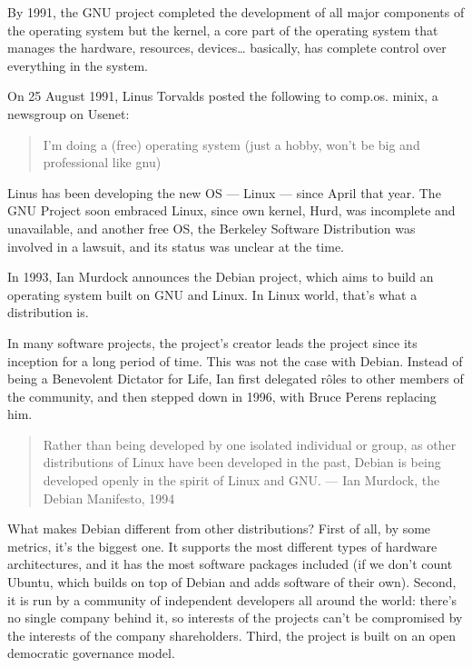\documentclass[10pt, a5paper]{article}
\begin{document}
By 1991, the GNU project completed the development of all major components of the operating system but the kernel, a core part of the operating system that manages the hardware, resources, devices\ldots{} basically, has complete control over everything in the system.

On 25 August 1991, Linus Torvalds posted the following to comp.os. minix, a newsgroup on Usenet:

\begin{quotation}
I'm doing a (free) operating system (just a hobby, won't be big and professional like gnu)

\end{quotation}

Linus has been developing the new OS  —  Linux  —  since April that year. The GNU Project soon embraced Linux, since own kernel, Hurd, was incomplete and unavailable, and another free OS, the Berkeley Software Distribution was involved in a lawsuit, and its status was unclear at the time.

In 1993, Ian Murdock announces the Debian project, which aims to build an operating system built on GNU and Linux. In Linux world, that's what a distribution is.

In many software projects, the project's creator leads the project since its inception for a long period of time. This was not the case with Debian. Instead of being a Benevolent Dictator for Life, Ian first delegated rôles to other members of the community, and then stepped down in 1996, with Bruce Perens replacing him.

\begin{quotation}
Rather than being developed by one isolated individual or group, as other distributions of Linux have been developed in the past, Debian is being developed openly in the spirit of Linux and GNU.  ---  Ian Murdock, the Debian Manifesto, 1994

\end{quotation}

What makes Debian different from other distributions? First of all, by some metrics, it's the biggest one. It supports the most different types of hardware architectures, and it has the most software packages included (if we don't count Ubuntu, which builds on top of Debian and adds software of their own). Second, it is run by a community of independent developers all around the world: there's no single company behind it, so interests of the projects can't be compromised by the interests of the company shareholders. Third, the project is built on an open democratic governance model.
\end{document}
